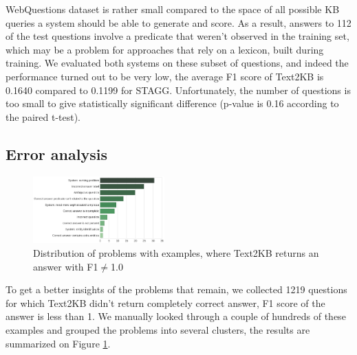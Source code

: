 WebQuestions dataset is rather small compared to the space of all possible KB queries a system should be able to generate and score.
As a result, answers to 112 of the test questions involve a predicate that weren't observed in the training set, which may be a problem for approaches that rely on a lexicon, built during training.
We evaluated both systems on these subset of questions, and indeed the performance turned out to be very low, \ie the average F1 score of Text2KB is 0.1640 compared to 0.1199 for STAGG.
Unfortunately, the number of questions is too small to give statistically significant difference (p-value is 0.16 according to the paired t-test).

\subsection{Error analysis}

\begin{figure}
\centering
\includegraphics[width=0.45\textwidth]{img/error_analysis}
\caption{Distribution of problems with examples, where Text2KB returns an answer with F1$\neq$1.0}
\label{fig:error_analysis}
\end{figure}

To get a better insights of the problems that remain, we collected 1219 questions for which Text2KB didn't return completely correct answer, \ie F1 score of the answer is less than 1.
We manually looked through a couple of hundreds of these examples  and grouped the problems into several clusters, the results are summarized on Figure \ref{fig:error_analysis}.

